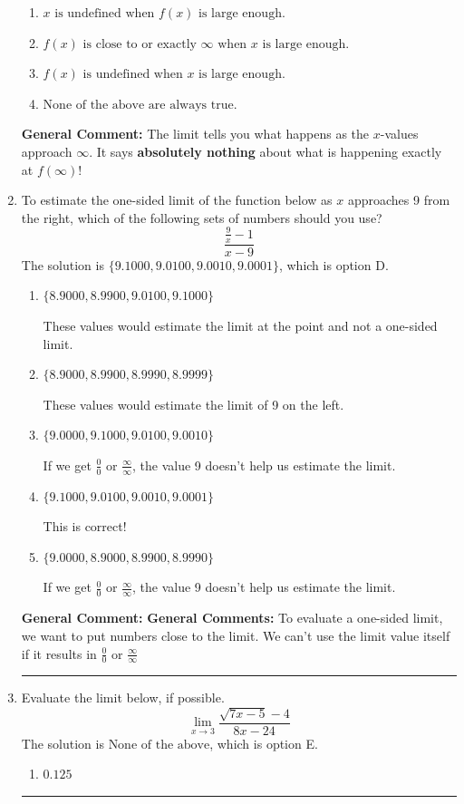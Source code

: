 \documentclass{extbook}[14pt]
\newcommand{\litem}[1]{\item #1

\rule{\textwidth}{0.4pt}}
\begin{document}
\begin{enumerate}
{\begin{enumerate}[label=\Alph*.]
\item \( x \text{ is undefined when } f(x) \text{ is large enough}. \)


\item \( f(x) \text{ is close to or exactly } \infty \text{ when } x \text{ is large enough}. \)


\item \( f(x) \text{ is undefined when } x \text{ is large enough}. \)


\item \( \text{None of the above are always true.} \)


\end{enumerate}

\textbf{General Comment:} The limit tells you what happens as the $x$-values approach $\infty$. It says \textbf{absolutely nothing} about what is happening exactly at $f(\infty)$!
}
\litem{
To estimate the one-sided limit of the function below as $x$ approaches 9 from the right, which of the following sets of numbers should you use?
\[ \frac{\frac{9}{x} - 1}{x - 9} \]The solution is \( \{ 9.1000, 9.0100, 9.0010, 9.0001 \} \), which is option D.\begin{enumerate}[label=\Alph*.]
\item \( \{ 8.9000, 8.9900, 9.0100, 9.1000 \} \)

These values would estimate the limit at the point and not a one-sided limit.
\item \( \{ 8.9000, 8.9900, 8.9990, 8.9999 \} \)

These values would estimate the limit of 9 on the left.
\item \( \{ 9.0000, 9.1000, 9.0100, 9.0010 \} \)

If we get $\frac{0}{0}$ or $\frac{\infty}{\infty}$, the value 9 doesn't help us estimate the limit.
\item \( \{ 9.1000, 9.0100, 9.0010, 9.0001 \} \)

This is correct!
\item \( \{ 9.0000, 8.9000, 8.9900, 8.9990 \} \)

If we get $\frac{0}{0}$ or $\frac{\infty}{\infty}$, the value 9 doesn't help us estimate the limit.
\end{enumerate}

\textbf{General Comment:} \textbf{General Comments:} To evaluate a one-sided limit, we want to put numbers close to the limit. We can't use the limit value itself if it results in $\frac{0}{0}$ or $\frac{\infty}{\infty}$
}
\litem{
Evaluate the limit below, if possible.
\[ \lim_{x \rightarrow 3} \frac{\sqrt{7x - 5} - 4}{8x - 24} \]The solution is \( \text{None of the above} \), which is option E.\begin{enumerate}[label=\Alph*.]
\item \( 0.125 \)


\end{enumerate}}
\end{enumerate}
\end{document}
